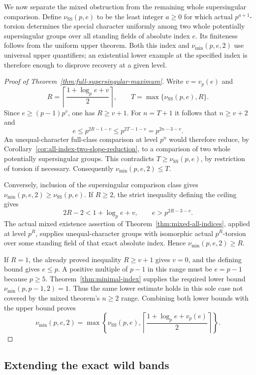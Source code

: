 We now separate the mixed obstruction from the remaining whole
supersingular comparison.  Define $\nu_{\mathrm{SS}}(p,e)$ to be the
least integer $a\ge0$ for which actual $p^{a+1}$-torsion determines
the special character uniformly among two whole potentially
supersingular groups over all standing fields of absolute index $e$.
Its finiteness follows from the uniform upper theorem.  Both this
index and $\nu_{\min}(p,e,2)$ use universal upper quantifiers; an
existential lower example at the specified index is therefore enough
to disprove recovery at a given level.

\begin{proof}[Proof of Theorem~\ref{thm:full-supersingular-maximum}]
Write $v=v_p(e)$ and
\[
 R=\left\lceil\frac{1+\log_p e+v}{2}\right\rceil,
 \qquad T=\max\{\nu_{\mathrm{SS}}(p,e),R\}.
\]
Since $e\ge(p-1)p^v$, one has $R\ge v+1$.  For $n=T+1$ it
follows that $n\ge v+2$ and
\[
 e\le p^{2R-1-v}\le p^{2T-1-v}=p^{2n-3-v}.
\]
An unequal-character full-class comparison at level $p^n$ would
therefore reduce, by
Corollary~\ref{cor:all-index-two-slope-reduction}, to a comparison
of two whole potentially supersingular groups.  This contradicts
$T\ge\nu_{\mathrm{SS}}(p,e)$, by restriction of torsion if necessary.
Consequently $\nu_{\min}(p,e,2)\le T$.

Conversely, inclusion of the supersingular comparison class gives
$\nu_{\min}(p,e,2)\ge\nu_{\mathrm{SS}}(p,e)$.  If $R\ge2$, the
strict inequality defining the ceiling gives
\[
 2R-2<1+\log_p e+v,
 \qquad e>p^{2R-3-v}.
\]
The actual mixed existence assertion of
Theorem~\ref{thm:mixed-all-indices}, applied at level $p^R$, supplies
unequal-character groups with isomorphic actual $p^R$-torsion over
some standing field of that exact absolute index.  Hence
$\nu_{\min}(p,e,2)\ge R$.

If $R=1$, the already proved inequality $R\ge v+1$ gives $v=0$,
and the defining bound gives $e\le p$.  A positive multiple of
$p-1$ in this range must be $e=p-1$ because $p\ge5$.
Theorem~\ref{thm:minimal-index} supplies the required lower bound
$\nu_{\min}(p,p-1,2)=1$.  Thus the same lower estimate holds in
this sole case not covered by the mixed theorem's $n\ge2$ range.
Combining both lower bounds with the upper bound proves
\[
 \nu_{\min}(p,e,2)
 =\max\left\{\nu_{\mathrm{SS}}(p,e),
 \left\lceil\frac{1+\log_p e+v_p(e)}2\right\rceil\right\}.
\]
\end{proof}

\subsection{Extending the exact wild bands}\label{sec:extended-wild-bands}

